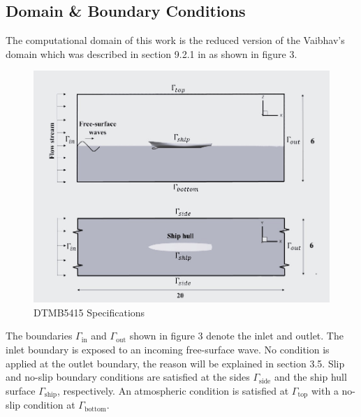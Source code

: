 \documentclass[12pt]{article} %
\begin{document}
\subsection{Domain \& Boundary Conditions}
The computational domain of this work is the reduced version of the Vaibhav's domain which was described in section 9.2.1 in \cite{joshi2018} as shown in figure 3. 
\begin{figure}[ht]
    \centering
    \includegraphics[width=1\textwidth]{Domain.jpg}
    \caption{DTMB5415 Specifications}
\end{figure}
The boundaries \(\Gamma_{\text{in}}\) and \(\Gamma_{\text{out}}\) shown in figure 3 denote the inlet 
and outlet. The inlet boundary is exposed to an incoming free-surface wave. 
No condition is applied at the outlet boundary, the reason will be explained in section 3.5. 
Slip and no-slip boundary conditions are satisfied at the sides \(\Gamma_{\text{side}}\) and the 
ship hull surface \(\Gamma_{\text{ship}}\), respectively. An atmospheric condition is satisfied 
at \(\Gamma_{\text{top}}\) with a no-slip condition at \(\Gamma_{\text{bottom}}\).
\end{document}
